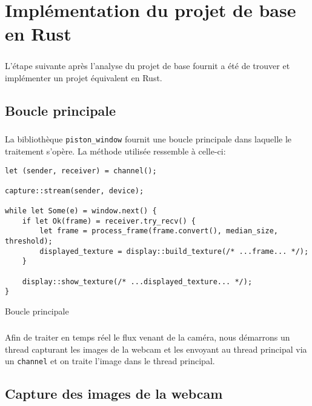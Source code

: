 \documentclass{report}
\begin{document}
\chapter{Implémentation du projet de base en Rust}

\paragraph{} L'étape suivante après l'analyse du projet de base fournit a été
de trouver et implémenter un projet équivalent en Rust.

\section{Boucle principale}

\paragraph{} La bibliothèque \texttt{piston\_window} fournit une boucle
principale dans laquelle le traitement s'opère. La méthode utilisée ressemble à
celle-ci:\\

\begin{listing}[H]
\begin{verbatim}
let (sender, receiver) = channel();

capture::stream(sender, device);

while let Some(e) = window.next() {
	if let Ok(frame) = receiver.try_recv() {
		let frame = process_frame(frame.convert(), median_size, threshold);
		displayed_texture = display::build_texture(/* ...frame... */);
	}

	display::show_texture(/* ...displayed_texture... */);
}
\end{verbatim}
\label{lst:main_loop}
\caption{Boucle principale}
\end{listing}

\paragraph{} Afin de traiter en temps réel le flux venant de la caméra, nous
démarrons un thread capturant les images de la webcam et les envoyant au thread
principal via un \texttt{channel} et on traite l'image dans le thread
principal.

\section{Capture des images de la webcam}
\end{document}
